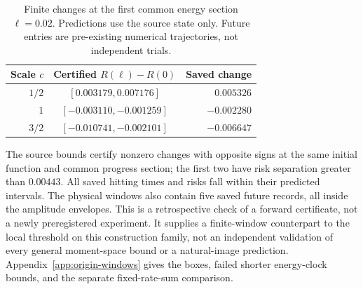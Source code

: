 \begin{table}[t]
\centering\small
\caption{Finite changes at the first common energy section $\ell=0.02$. Predictions use the source state only. Future entries are pre-existing numerical trajectories, not independent trials.}
\label{tab:origin-windows}
\setlength{\tabcolsep}{4pt}
\begin{tabular}{rcr}
\toprule
Scale $c$&Certified $R(\ell)-R(0)$&Saved change\\\midrule
$1/2$&$[0.003179,0.007176]$&$0.005326$\\
$1$&$[-0.003110,-0.001259]$&$-0.002280$\\
$3/2$&$[-0.010741,-0.002101]$&$-0.006647$\\
\bottomrule
\end{tabular}
\end{table}

The source bounds certify nonzero changes with opposite signs at the same initial function and common progress section; the first two have risk separation greater than $0.00443$. All saved hitting times and risks fall within their predicted intervals. The physical windows also contain five saved future records, all inside the amplitude envelopes. This is a retrospective check of a forward certificate, not a newly preregistered experiment. It supplies a finite-window counterpart to the local threshold on this construction family, not an independent validation of every general moment-space bound or a natural-image prediction. Appendix~\ref{app:origin-windows} gives the boxes, failed shorter energy-clock bounds, and the separate fixed-rate-sum comparison.
